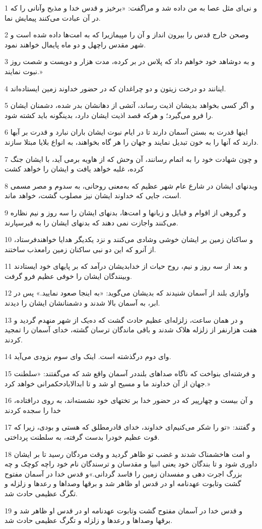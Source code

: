 \par 1 و نی‌ای مثل عصا به من داده شد و مراگفت: «برخیز و قدس خدا و مذبح وآنانی را که در آن عبادت می‌کنند پیمایش نما.
\par 2 وصحن خارج قدس را بیرون انداز و آن را مپیمازیرا که به امت‌ها داده شده است و شهر مقدس راچهل و دو ماه پایمال خواهند نمود.
\par 3 و به دوشاهد خود خواهم داد که پلاس در بر کرده، مدت هزار و دویست و شصت روز نبوت نمایند.»
\par 4 اینانند دو درخت زیتون و دو چراغدان که در حضور خداوند زمین ایستاده‌اند.
\par 5 و اگر کسی بخواهد بدیشان اذیت رساند، آتشی از دهانشان بدر شده، دشمنان ایشان را فرو می‌گیرد؛ و هر‌که قصد اذیت ایشان دارد، بدینگونه باید کشته شود.
\par 6 اینها قدرت به بستن آسمان دارند تا در ایام نبوت ایشان باران نبارد و قدرت بر آبها دارند که آنها را به خون تبدیل نمایند و جهان را هر گاه بخواهند، به انواع بلایا مبتلا سازند.
\par 7 و چون شهادت خود را به اتمام رسانند، آن وحش که از هاویه برمی آید، با ایشان جنگ کرده، غلبه خواهد یافت و ایشان را خواهد کشت
\par 8 وبدنهای ایشان در شارع عام شهر عظیم که به‌معنی روحانی، به سدوم و مصر مسمی است، جایی که خداوند ایشان نیز مصلوب گشت، خواهد ماند.
\par 9 و گروهی از اقوام و قبایل و زبانها و امت‌ها، بدنهای ایشان را سه روز و نیم نظاره می‌کنند واجازت نمی دهند که بدنهای ایشان را به قبرسپارند.
\par 10 و ساکنان زمین بر ایشان خوشی وشادی می‌کنند و نزد یکدیگر هدایا خواهندفرستاد، از آنرو که این دو نبی ساکنان زمین رامعذب ساختند.
\par 11 و بعد از سه روز و نیم، روح حیات از خدابدیشان درآمد که بر پایهای خود ایستادند وبینندگان ایشان را خوفی عظیم فرو گرفت.
\par 12 وآوازی بلند از آسمان شنیدند که بدیشان می‌گوید: «به اینجا صعود نمایید.» پس در ابر، به آسمان بالا شدند و دشمنانشان ایشان را دیدند.
\par 13 و در همان ساعت، زلزله‌ای عظیم حادث گشت که ده‌یک از شهر منهدم گردید و هفت هزارنفر از زلزله هلاک شدند و باقی ماندگان ترسان گشته، خدای آسمان را تمجید کردند.
\par 14 وای دوم درگذشته است. اینک وای سوم بزودی می‌آید.
\par 15 و فرشته‌ای بنواخت که ناگاه صداهای بلنددر آسمان واقع شد که می‌گفتند: «سلطنت جهان از آن خداوند ما و مسیح او شد و تا ابدالابادحکمرانی خواهد کرد.»
\par 16 و آن بیست و چهارپیر که در حضور خدا بر تختهای خود نشسته‌اند، به روی درافتاده، خدا را سجده کردند
\par 17 و گفتند: «تو را شکر می‌کنیم‌ای خداوند، خدای قادرمطلق که هستی و بودی، زیرا که قوت عظیم خودرا بدست گرفته، به سلطنت پرداختی.
\par 18 و امت هاخشمناک شدند و غضب تو ظاهر گردید و وقت مردگان رسید تا بر ایشان داوری شود و تا بندگان خود یعنی انبیا و مقدسان و ترسندگان نام خود راچه کوچک و چه بزرگ اجرت دهی و مفسدان زمین را فاسد گردانی.»و قدس خدا در آسمان مفتوح گشت وتابوت عهدنامه او در قدس او ظاهر شد و برقها وصداها و رعدها و زلزله و تگرگ عظیمی حادث شد.
\par 19 و قدس خدا در آسمان مفتوح گشت وتابوت عهدنامه او در قدس او ظاهر شد و برقها وصداها و رعدها و زلزله و تگرگ عظیمی حادث شد.

